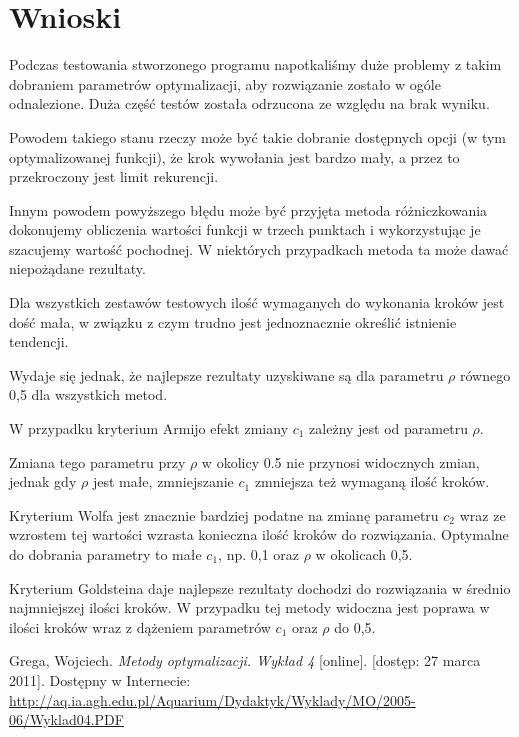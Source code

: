 \documentclass{classrep}
\begin{document}
\section{Wnioski}
Podczas testowania stworzonego programu napotkaliśmy duże problemy z takim dobraniem parametrów optymalizacji, aby rozwiązanie zostało w ogóle odnalezione. Duża część testów została odrzucona ze względu na brak wyniku.

Powodem takiego stanu rzeczy może być takie dobranie dostępnych opcji (w tym optymalizowanej funkcji), że krok wywołania jest bardzo mały, a przez to przekroczony jest limit rekurencji.

Innym powodem powyższego błędu może być przyjęta metoda różniczkowania \ppauza dokonujemy obliczenia wartości funkcji w trzech punktach i wykorzystując je szacujemy wartość pochodnej. W niektórych przypadkach metoda ta może dawać niepożądane rezultaty.

\smallskip

Dla wszystkich zestawów testowych ilość wymaganych do wykonania kroków jest dość mała, w związku z czym trudno jest jednoznacznie określić istnienie tendencji.

Wydaje się jednak, że najlepsze rezultaty uzyskiwane są dla parametru $\rho$ równego 0,5 dla wszystkich metod.

\smallskip

W przypadku kryterium Armijo efekt zmiany $c_1$ zależny jest od parametru $\rho$.

Zmiana tego parametru przy $\rho$ w okolicy 0.5 nie przynosi widocznych zmian, jednak gdy $\rho$ jest małe, zmniejszanie $c_1$ zmniejsza też wymaganą ilość kroków.

\smallskip

Kryterium Wolfa jest znacznie bardziej podatne na zmianę parametru $c_2$ \ppauza wraz ze wzrostem tej wartości wzrasta konieczna ilość kroków do rozwiązania. Optymalne do dobrania parametry to małe $c_1$, np. 0,1 oraz $\rho$ w okolicach 0,5.

\smallskip

Kryterium Goldsteina daje najlepsze rezultaty \ppauza dochodzi do rozwiązania w średnio najmniejszej ilości kroków. W przypadku tej metody widoczna jest poprawa w ilości kroków wraz z dążeniem parametrów $c_1$ oraz $\rho$ do 0,5.

\begin{thebibliography}{99}
Grega, Wojciech. \textit{Metody optymalizacji. Wykład 4} [online]. [dostęp: 27
marca 2011]. Dostępny w Internecie:
\url{http://aq.ia.agh.edu.pl/Aquarium/Dydaktyk/Wyklady/MO/2005-06/Wyklad04.PDF}
\end{thebibliography}
\end{document}
